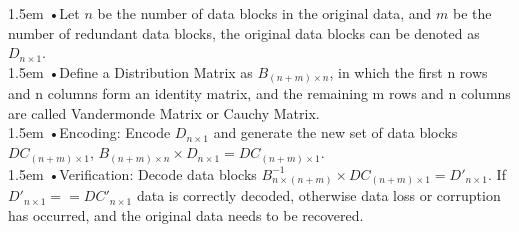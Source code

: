 \documentclass[10pt,a4paper]{article}
\begin{document}
\hangindent 1.5em
\noindent   
•\quad Let $n$ be the number of data blocks in the original data, and $m$ be the number of redundant data blocks, the original data blocks can be denoted as $D_{n \times 1}$.
\vspace{-0.8em}
\\

\hangindent 1.5em
\noindent   
•\quad Define a Distribution Matrix as $B_{(n+m) \times n}$, in which the first n rows and n columns form an identity matrix, and the remaining m rows and n columns are called Vandermonde Matrix or Cauchy Matrix.
\vspace{-0.8em}
\\

\hangindent 1.5em
\noindent   
•\quad Encoding: Encode $D_{n \times 1}$ and generate the new set of data blocks $DC_{(n+m) \times 1}$, $B_{(n+m) \times n} \times D_{n \times 1} = DC_{(n+m) \times 1}$.
\vspace{-0.8em}
\\

\hangindent 1.5em
\noindent   
•\quad Verification: Decode data blocks $B^{-1}_{n \times (n+m)} \times DC_{(n+m) \times 1} = D'_{n \times 1}$. If $D'_{n \times 1}==DC'_{n \times 1}$ data is correctly decoded, otherwise data loss or corruption has occurred, and the original data needs to be recovered.
\vspace{-0.8em}
\\
\end{document}
